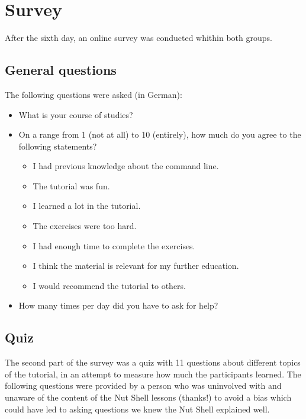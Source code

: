 \documentclass[a4paper,twoside,abstract=on,cleardoublepage=empty,numbers=noenddot,toc=bib]{scrreprt}
\begin{document}
\section{Survey}

After the sixth day, an online survey was conducted whithin both groups.

\subsection{General questions}

The following questions were asked (in German):

\begin{itemize}
    \item What is your course of studies?
    \item On a range from 1 (not at all) to 10 (entirely), how much do you agree to the following statements?
        \begin{itemize}
            \item I had previous knowledge about the command line.
            \item The tutorial was fun.
            \item I learned a lot in the tutorial.
            \item The exercises were too hard.
            \item I had enough time to complete the exercises.
            \item I think the material is relevant for my further education.
            \item I would recommend the tutorial to others.
        \end{itemize}
    \item How many times per day did you have to ask for help?
\end{itemize}

\subsection{Quiz}

The second part of the survey was a quiz with 11 questions about different topics of the tutorial, in an attempt to measure how much the participants learned. The following questions were provided by a person who was uninvolved with and unaware of the content of the Nut Shell lessons (thanks!) to avoid a bias which could have led to asking questions we knew the Nut Shell explained well.
\end{document}
